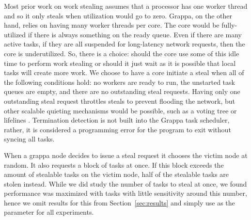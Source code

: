 Most prior work on work stealing assumes that a processor has one worker
thread and so it only steals when utilization would go to zero. Grappa,
on the other hand, relies on having many worker threads per core. The
core would be fully-utilized if there is always something on the ready
queue. Even if there are many active tasks, if they are all suspended
for long-latency network requests, then the core is underutilized. So,
there is a choice: should the core use some of this idle time to perform
work stealing or should it just wait as it is possible that local tasks
will create more work. We choose to have a core initiate a steal when
all of the following conditions hold: no workers are ready to run, the
unstarted task queues are empty, and there are no outstanding steal
requests. Having only one outstanding steal request throttles steals to
prevent flooding the network, but other scalable quieting mechanisms
would be possible, such as a voting
tree\cite{scalableWorkStealingOrCilk98} or lifelines \cite{lifelines}.
Termination detection is not built into the Grappa task scheduler,
rather, it is considered a programming error for the program to exit
without syncing all tasks.


When a grappa node decides to issue a steal request it chooses the
victim node at random.  It also requests a block of tasks at once.  If
this block exceeds the amount of stealable tasks on the victim node,
half of the stealable tasks are stolen instead.  While we did study the
number of tasks to steal at once, we found performance was maximized
with  tasks with little sensitivity around this number,
hence we omit results for this from Section~\ref{sec:results} and simply
use  as the parameter for all experiments.



